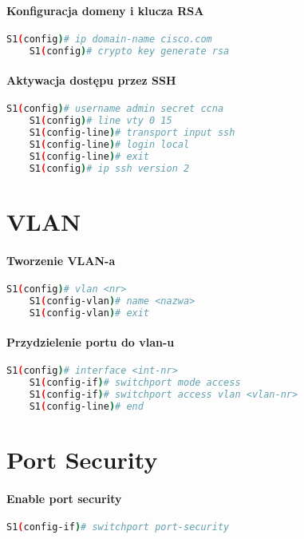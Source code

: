 \documentclass[12pt]{article}
\begin{document}
	\paragraph{Konfiguracja domeny i klucza RSA}
	\begin{lstlisting}[language=bash]	
	S1(config)# ip domain-name cisco.com
	S1(config)# crypto key generate rsa
	\end{lstlisting}
		
	\paragraph{Aktywacja dostępu przez SSH}
	\begin{lstlisting}[language=bash]
	S1(config)# username admin secret ccna
	S1(config)# line vty 0 15
	S1(config-line)# transport input ssh
	S1(config-line)# login local
	S1(config-line)# exit
	S1(config)# ip ssh version 2
	\end{lstlisting}
		
		
	
\newpage	

\section{VLAN}
	\paragraph{Tworzenie VLAN-a}
	\begin{lstlisting}[language=bash]
	S1(config)# vlan <nr>
	S1(config-vlan)# name <nazwa>
	S1(config-vlan)# exit
	\end{lstlisting}
	
	
	\paragraph{Przydzielenie portu do vlan-u}
	\begin{lstlisting}[language=bash]
	S1(config)# interface <int-nr>
	S1(config-if)# switchport mode access
	S1(config-if)# switchport access vlan <vlan-nr>
	S1(config-line)# end
	\end{lstlisting}
	
\newpage

\section{Port Security}
	\paragraph{Enable port security}
	\begin{lstlisting}[language=bash]
	S1(config-if)# switchport port-security
	\end{lstlisting}
		
\end{document}
